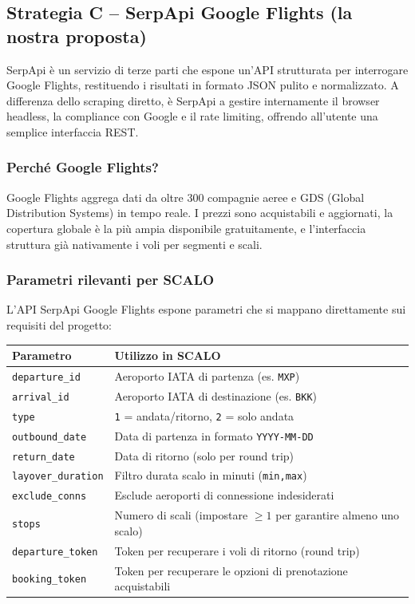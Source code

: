 \documentclass[a4paper, 11pt]{article}
\begin{document}
\subsection{Strategia C -- SerpApi Google Flights (la nostra proposta)}

SerpApi \`e un servizio di terze parti che espone un'API strutturata per interrogare Google Flights, restituendo i risultati in formato JSON pulito e normalizzato. A differenza dello scraping diretto, \`e SerpApi a gestire internamente il browser headless, la compliance con Google e il rate limiting, offrendo all'utente una semplice interfaccia REST.

\subsubsection{Perch\'e Google Flights?}

Google Flights aggrega dati da oltre 300 compagnie aeree e GDS (Global Distribution Systems) in tempo reale. I prezzi sono acquistabili e aggiornati, la copertura globale \`e la pi\`u ampia disponibile gratuitamente, e l'interfaccia struttura gi\`a nativamente i voli per segmenti e scali.

\subsubsection{Parametri rilevanti per SCALO}

L'API SerpApi Google Flights espone parametri che si mappano direttamente sui requisiti del progetto:

\begin{center}
\begin{tabularx}{\textwidth}{@{} >{\ttfamily\small}p{4cm} X @{}}
\toprule
\rowcolor{light}
\textbf{Parametro} & \textbf{Utilizzo in SCALO} \\
\midrule
\texttt{departure\_id}   & Aeroporto IATA di partenza (es. \texttt{MXP}) \\[2pt]
\texttt{arrival\_id}     & Aeroporto IATA di destinazione (es. \texttt{BKK}) \\[2pt]
\texttt{type}            & \texttt{1} = andata/ritorno, \texttt{2} = solo andata \\[2pt]
\texttt{outbound\_date}  & Data di partenza in formato \texttt{YYYY-MM-DD} \\[2pt]
\texttt{return\_date}    & Data di ritorno (solo per round trip) \\[2pt]
\texttt{layover\_duration} & Filtro durata scalo in minuti (\texttt{min,max}) \\[2pt]
\texttt{exclude\_conns}  & Esclude aeroporti di connessione indesiderati \\[2pt]
\texttt{stops}           & Numero di scali (impostare $\geq 1$ per garantire almeno uno scalo) \\[2pt]
\texttt{departure\_token} & Token per recuperare i voli di ritorno (round trip) \\[2pt]
\texttt{booking\_token}  & Token per recuperare le opzioni di prenotazione acquistabili \\
\bottomrule
\end{tabularx}
\end{center}
\end{document}
